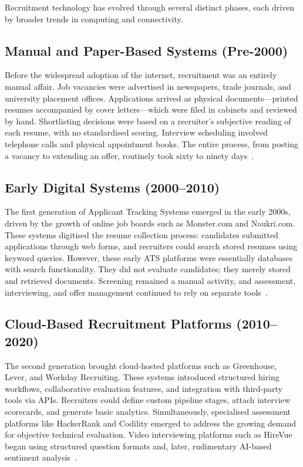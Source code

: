 Recruitment technology has evolved through several distinct phases, each driven by broader trends in computing and connectivity.

\subsection{Manual and Paper-Based Systems (Pre-2000)}

Before the widespread adoption of the internet, recruitment was an entirely manual affair. Job vacancies were advertised in newspapers, trade journals, and university placement offices. Applications arrived as physical documents---printed resumes accompanied by cover letters---which were filed in cabinets and reviewed by hand. Shortlisting decisions were based on a recruiter's subjective reading of each resume, with no standardised scoring. Interview scheduling involved telephone calls and physical appointment books. The entire process, from posting a vacancy to extending an offer, routinely took sixty to ninety days~\cite{cappelli2019}.

\subsection{Early Digital Systems (2000--2010)}

The first generation of Applicant Tracking Systems emerged in the early 2000s, driven by the growth of online job boards such as Monster.com and Naukri.com. These systems digitised the resume collection process: candidates submitted applications through web forms, and recruiters could search stored resumes using keyword queries. However, these early ATS platforms were essentially databases with search functionality. They did not evaluate candidates; they merely stored and retrieved documents. Screening remained a manual activity, and assessment, interviewing, and offer management continued to rely on separate tools~\cite{cappelli2019}.

\subsection{Cloud-Based Recruitment Platforms (2010--2020)}

The second generation brought cloud-hosted platforms such as Greenhouse, Lever, and Workday Recruiting. These systems introduced structured hiring workflows, collaborative evaluation features, and integration with third-party tools via APIs. Recruiters could define custom pipeline stages, attach interview scorecards, and generate basic analytics. Simultaneously, specialised assessment platforms like HackerRank and Codility emerged to address the growing demand for objective technical evaluation. Video interviewing platforms such as HireVue began using structured question formats and, later, rudimentary AI-based sentiment analysis~\cite{hmoud2020}.

